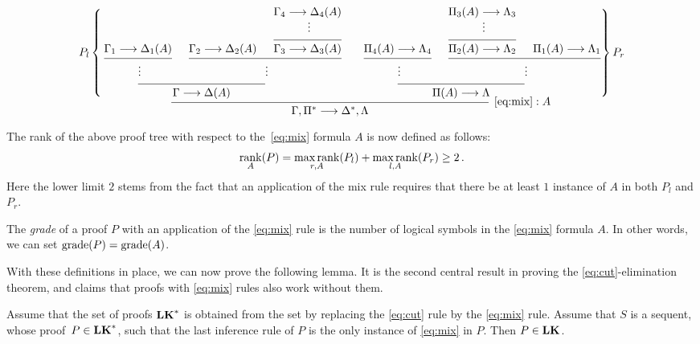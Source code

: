\documentclass[11pt,a4paper]{article}
\begin{document}
\small
\begin{equation*}
    \begin{prooftree}
        \hypo{\Gamma_1\seq\Delta_1(A)}
        \infer1{}
        \ellipsis{}{}
        \hypo{\Gamma_2\seq\Delta_2(A)}
        \hypo{\Gamma_4\seq\Delta_4(A)}
        \ellipsis{}{}
        \infer1{\Gamma_3\seq\Delta_3(A)}
        \infer2{}
        \ellipsis{}{}
        \infer2{\Gamma\seq\Delta(A)}
        \delims{P_l\left\{}{\right.}
        \hypo{\Pi_4(A)\seq\Lambda_4}
        \infer1{}
        \ellipsis{}{}
        \hypo{\Pi_3(A)\seq\Lambda_3}
        \ellipsis{}{}
        \infer1{\Pi_2(A)\seq\Lambda_2}
        \hypo{\Pi_1(A)\seq\Lambda_1}
        \infer2{}
        \ellipsis{}{}
        \infer2{\Pi(A)\seq\Lambda}
        \delims{\left.}{\right\}P_r}
        \infer2[\(\eqref{eq:mix}:A\)]{\Gamma,\Pi^*\seq\Delta^*,\Lambda}
    \end{prooftree}
\end{equation*}
\normalsize

The rank of the above proof tree with respect to the~\eqref{eq:mix} formula \(A\)
is now defined as follows:
\begin{equation*}
    \operatorname*{rank}_A(P) = \operatorname*{max\,rank}_{r,A}(P_l) + \operatorname*{max\,rank}_{l,A}(P_r) \geq 2 \,.
\end{equation*}
Here the lower limit \(2\) stems from the fact that
an application of the mix rule requires that there
be at least \(1\) instance of \(A\) in both \(P_l\) and \(P_r\).

\begin{definition}\label{def:grade of a proof}
    The \emph{grade} of a proof \(P\) with an application of the \eqref{eq:mix}
    rule is the number of logical symbols in the \eqref{eq:mix} formula \(A\).
    In other words, we can set \(\operatorname{grade}(P) = \operatorname{grade}(A)\).
\end{definition}

With these definitions in place, we can now prove the following lemma.
It is the second central result in proving the \eqref{eq:cut}-elimination theorem,
and claims that proofs with \eqref{eq:mix} rules also work without them.

\begin{lemma}[Lemma 5.4]\label{lem:5.4}
Assume that the set of proofs \(\textbf{LK}^\ast\) is obtained from
the set \LK{} by replacing the \eqref{eq:cut} rule by
the \eqref{eq:mix} rule. Assume that \(S\) is a sequent,
whose proof~\(P\in\textbf{LK}^\ast\), such that the last inference rule of \(P\)
is the only instance of \eqref{eq:mix} in \(P\).
Then \(P\in\textbf{LK}\).
\end{lemma}
\end{document}
